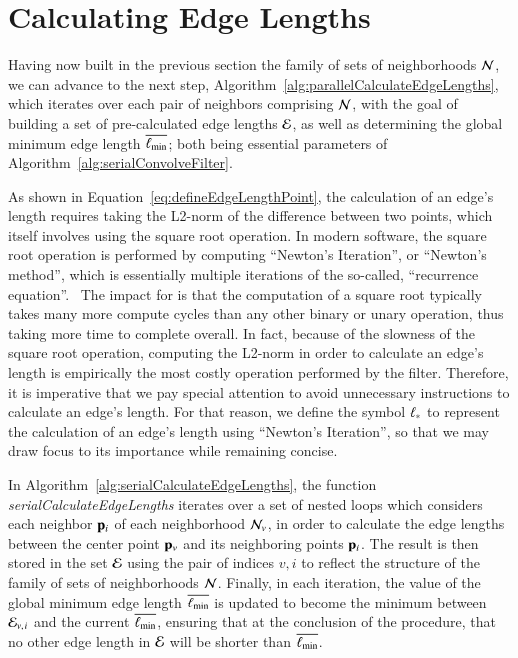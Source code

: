 %
%
%
%
\section{Calculating Edge Lengths}
\label{ch4sCEL}
Having now built in the previous section the family of sets of neighborhoods $\mathcal{N}$, we can advance to the next step, Algorithm~\ref{alg:parallelCalculateEdgeLengths}, which iterates over each pair of neighbors comprising $\mathcal{N}$, with the goal of building a set of pre-calculated edge lengths $\mathcal{E}$, as well as determining the global minimum edge length $\overline{\ell_\text{min}}$; both being essential parameters of Algorithm~\ref{alg:serialConvolveFilter}.

As shown in Equation~\ref{eq:defineEdgeLengthPoint}, the calculation of an edge's length requires taking the L2-norm of the difference between two points, which itself involves using the square root operation. In modern software, the square root operation is performed by computing ``Newton's Iteration'', or ``Newton's method'', which is essentially multiple iterations of the so-called, ``recurrence equation''.~\cite{Weisstein19b} The impact for  is that the computation of a square root typically takes many more compute cycles than  any other binary or unary operation, thus taking more time to complete overall. In fact, because of the slowness of the square root operation, computing the L2-norm in order to calculate an edge's length is empirically the most costly operation performed by the filter. Therefore, it is imperative that we pay special attention to avoid unnecessary instructions to calculate an edge's length. For that reason, we define the symbol $\ell_\ast$ to represent the calculation of an edge's length using ``Newton's Iteration'', so that we may draw focus to its importance while remaining concise.%

In Algorithm~\ref{alg:serialCalculateEdgeLengths}, the function \textit{serialCalculateEdgeLengths} iterates over a set of nested loops which considers each neighbor $\mathbf{p}_i$ of each neighborhood $\mathcal{N}_v$, in order to calculate the edge lengths between the center point $\mathbf{p}_v$ and its neighboring points $\mathbf{p}_i$. The result is then stored in the set $\mathcal{E}$ using the pair of indices $v, i$ to reflect the structure of the family of sets of neighborhoods $\mathcal{N}$. Finally, in each iteration, the value of the global minimum edge length $\overline{\ell_\text{min}}$ is updated to become the minimum between $\mathcal{E}_{v,\kern.75pt i}$ and the current $\overline{\ell_\text{min}}$, ensuring that at the conclusion of the procedure, that no other edge length in $\mathcal{E}$ will be shorter than $\overline{\ell_\text{min}}$.

